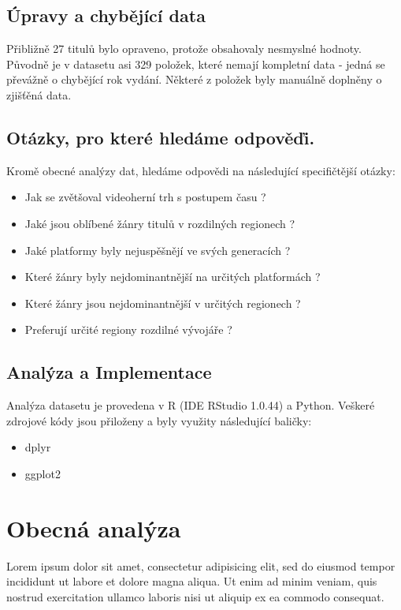 \documentclass[a4paper,11pt]{article}
\begin{document}
\subsection{Úpravy a chybějící data}
Přibližně 27 titulů bylo opraveno, protože obsahovaly nesmyslné hodnoty. Původně je v datasetu asi 329 položek, které nemají kompletní data - jedná se převážně o chybějící rok vydání. Některé z položek byly manuálně doplněny o zjišťěná data.

\subsection{Otázky, pro které hledáme odpověďi.}

Kromě obecné analýzy dat, hledáme odpovědi na následující specifičtější otázky:

\begin{itemize}
\item Jak se zvětšoval videoherní trh s postupem času ?

\item Jaké jsou oblíbené žánry titulů v rozdilných regionech ?

\item Jaké platformy byly nejuspěšnějí ve svých generacích ?

\item Které žánry byly nejdominantnější na určitých platformách ?

\item Které žánry jsou nejdominantnější v určitých regionech ?

\item Preferují určité regiony rozdilné vývojáře ?
\end{itemize}

\subsection{Analýza a Implementace}
Analýza datasetu je provedena v R (IDE RStudio 1.0.44) a Python. Veškeré zdrojové kódy jsou přiloženy a byly využity následující baličky:

\begin{itemize}
\item dplyr

\item ggplot2

\end{itemize}

\newpage

\section{Obecná analýza}
Lorem ipsum dolor sit amet, consectetur adipisicing elit, sed do eiusmod tempor incididunt ut labore et dolore magna aliqua. Ut enim ad minim veniam, quis nostrud exercitation ullamco laboris nisi ut aliquip ex ea commodo consequat.
\end{document}
